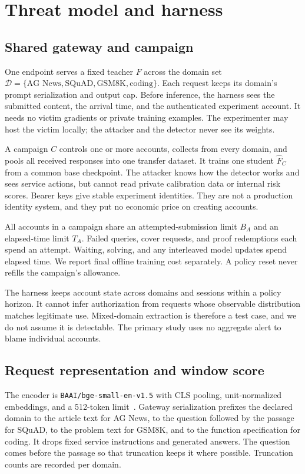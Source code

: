 \documentclass[journal]{IEEEtran}
\begin{document}
\section{Threat model and harness}
\label{sec:system}
\subsection{Shared gateway and campaign}
\label{sec:threat-system}
One endpoint serves a fixed teacher $F$ across the domain set $\mathcal D=\{\text{AG News},\text{SQuAD},\text{GSM8K},\text{coding}\}$. Each request keeps its domain's prompt serialization and output cap. Before inference, the harness sees the submitted content, the arrival time, and the authenticated experiment account. It needs no victim gradients or private training examples. The experimenter may host the victim locally; the attacker and the detector never see its weights.

A campaign $C$ controls one or more accounts, collects from every domain, and pools all received responses into one transfer dataset. It trains one student $\widehat F_C$ from a common base checkpoint. The attacker knows how the detector works and sees service actions, but cannot read private calibration data or internal risk scores. Bearer keys give stable experiment identities. They are not a production identity system, and they put no economic price on creating accounts.

All accounts in a campaign share an attempted-submission limit $B_A$ and an elapsed-time limit $T_A$. Failed queries, cover requests, and proof redemptions each spend an attempt. Waiting, solving, and any interleaved model updates spend elapsed time. We report final offline training cost separately. A policy reset never refills the campaign's allowance.

The harness keeps account state across domains and sessions within a policy horizon. It cannot infer authorization from requests whose observable distribution matches legitimate use. Mixed-domain extraction is therefore a test case, and we do not assume it is detectable. The primary study uses no aggregate alert to blame individual accounts.

\subsection{Request representation and window score}
\label{sec:score}
The encoder is \texttt{BAAI/bge-small-en-v1.5} with CLS pooling, unit-normalized embeddings, and a 512-token limit~\cite{xiao2024cpack,bge2023model}. Gateway serialization prefixes the declared domain to the article text for AG News, to the question followed by the passage for SQuAD, to the problem text for GSM8K, and to the function specification for coding. It drops fixed service instructions and generated answers. The question comes before the passage so that truncation keeps it where possible. Truncation counts are recorded per domain.
\end{document}
